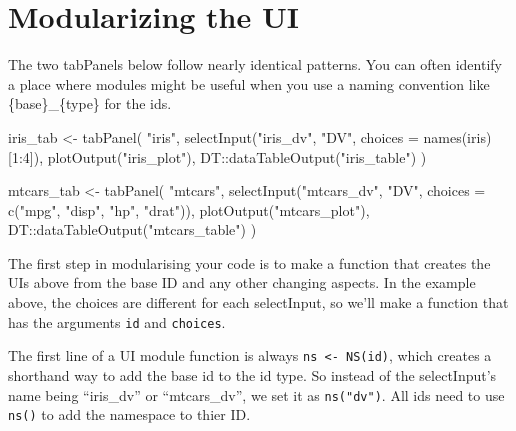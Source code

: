 \documentclass[
]{book}
\newenvironment{Shaded}{\begin{snugshade}}{\end{snugshade}}
\newcommand{\AttributeTok}[1]{\textcolor[rgb]{0.77,0.63,0.00}{#1}}
\newcommand{\DecValTok}[1]{\textcolor[rgb]{0.00,0.00,0.81}{#1}}
\newcommand{\FunctionTok}[1]{\textcolor[rgb]{0.00,0.00,0.00}{#1}}
\newcommand{\NormalTok}[1]{#1}
\newcommand{\OtherTok}[1]{\textcolor[rgb]{0.56,0.35,0.01}{#1}}
\newcommand{\SpecialCharTok}[1]{\textcolor[rgb]{0.00,0.00,0.00}{#1}}
\newcommand{\StringTok}[1]{\textcolor[rgb]{0.31,0.60,0.02}{#1}}
\begin{document}
\hypertarget{modularizing-the-ui}{%
\section{Modularizing the UI}\label{modularizing-the-ui}}

The two tabPanels below follow nearly identical patterns. You can often identify a place where modules might be useful when you use a naming convention like \{base\}\_\{type\} for the ids.

\begin{Shaded}
\begin{Highlighting}[]
\NormalTok{iris\_tab }\OtherTok{\textless{}{-}} \FunctionTok{tabPanel}\NormalTok{(}
  \StringTok{"iris"}\NormalTok{,}
  \FunctionTok{selectInput}\NormalTok{(}\StringTok{"iris\_dv"}\NormalTok{, }\StringTok{"DV"}\NormalTok{, }\AttributeTok{choices =} \FunctionTok{names}\NormalTok{(iris)[}\DecValTok{1}\SpecialCharTok{:}\DecValTok{4}\NormalTok{]),}
  \FunctionTok{plotOutput}\NormalTok{(}\StringTok{"iris\_plot"}\NormalTok{),}
\NormalTok{  DT}\SpecialCharTok{::}\FunctionTok{dataTableOutput}\NormalTok{(}\StringTok{"iris\_table"}\NormalTok{)}
\NormalTok{)}

\NormalTok{mtcars\_tab }\OtherTok{\textless{}{-}} \FunctionTok{tabPanel}\NormalTok{(}
  \StringTok{"mtcars"}\NormalTok{,}
  \FunctionTok{selectInput}\NormalTok{(}\StringTok{"mtcars\_dv"}\NormalTok{, }\StringTok{"DV"}\NormalTok{, }\AttributeTok{choices =} \FunctionTok{c}\NormalTok{(}\StringTok{"mpg"}\NormalTok{, }\StringTok{"disp"}\NormalTok{, }\StringTok{"hp"}\NormalTok{, }\StringTok{"drat"}\NormalTok{)),}
  \FunctionTok{plotOutput}\NormalTok{(}\StringTok{"mtcars\_plot"}\NormalTok{),}
\NormalTok{  DT}\SpecialCharTok{::}\FunctionTok{dataTableOutput}\NormalTok{(}\StringTok{"mtcars\_table"}\NormalTok{)}
\NormalTok{)}
\end{Highlighting}
\end{Shaded}

The first step in modularising your code is to make a function that creates the UIs above from the base ID and any other changing aspects. In the example above, the choices are different for each selectInput, so we'll make a function that has the arguments \texttt{id} and \texttt{choices}.

The first line of a UI module function is always \texttt{ns\ \textless{}-\ NS(id)}, which creates a shorthand way to add the base id to the id type. So instead of the selectInput's name being ``iris\_dv'' or ``mtcars\_dv'', we set it as \texttt{ns("dv")}. All ids need to use \texttt{ns()} to add the namespace to thier ID.
\end{document}
